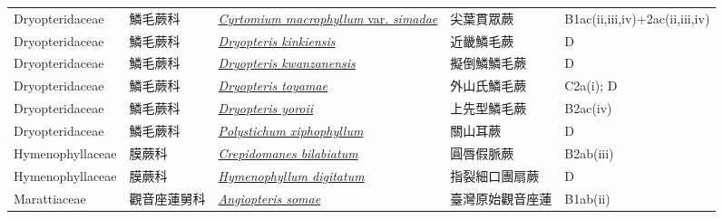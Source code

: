 {\begin{longtable}{p{2.5cm}p{2.5cm}p{4.5cm}p{2.5cm}p{3cm}}
    Dryopteridaceae & 鱗毛蕨科 & \href{http://www.theplantlist.org/tpl1.1/search?q=Cyrtomium+macrophyllum+var.+simadae}{\textit{Cyrtomium macrophyllum} var. \textit{simadae} } & 尖葉貫眾蕨 & B1ac(ii,iii,iv)+2ac(ii,iii,iv) \index{Cyrtomium@\textit{Cyrtomium}!macrophyllum@\textit{macrophyllum}!var. simadae@var. \textit{simadae}}  \index{尖葉貫眾蕨} \\
    Dryopteridaceae & 鱗毛蕨科 & \href{http://www.theplantlist.org/tpl1.1/search?q=Dryopteris+kinkiensis}{\textit{Dryopteris kinkiensis} } & 近畿鱗毛蕨 & D \index{Dryopteris@\textit{Dryopteris}!kinkiensis@\textit{kinkiensis}}  \index{近畿鱗毛蕨} \\
    Dryopteridaceae & 鱗毛蕨科 & \href{http://www.theplantlist.org/tpl1.1/search?q=Dryopteris+kwanzanensis}{\textit{Dryopteris kwanzanensis} } & 擬倒鱗鱗毛蕨 & D \index{Dryopteris@\textit{Dryopteris}!kwanzanensis@\textit{kwanzanensis}}  \index{擬倒鱗鱗毛蕨} \\
    Dryopteridaceae & 鱗毛蕨科 & \href{http://www.theplantlist.org/tpl1.1/search?q=Dryopteris+toyamae}{\textit{Dryopteris toyamae} } & 外山氏鱗毛蕨 & C2a(i); D \index{Dryopteris@\textit{Dryopteris}!toyamae@\textit{toyamae}}  \index{外山氏鱗毛蕨} \\
    Dryopteridaceae & 鱗毛蕨科 & \href{http://www.theplantlist.org/tpl1.1/search?q=Dryopteris+yoroii}{\textit{Dryopteris yoroii} } & 上先型鱗毛蕨 & B2ac(iv) \index{Dryopteris@\textit{Dryopteris}!yoroii@\textit{yoroii}}  \index{上先型鱗毛蕨} \\
    Dryopteridaceae & 鱗毛蕨科 & \href{http://www.theplantlist.org/tpl1.1/search?q=Polystichum+xiphophyllum}{\textit{Polystichum xiphophyllum} } & 關山耳蕨 & D \index{Polystichum@\textit{Polystichum}!xiphophyllum@\textit{xiphophyllum}}  \index{關山耳蕨} \\
    Hymenophyllaceae & 膜蕨科 & \href{http://www.theplantlist.org/tpl1.1/search?q=Crepidomanes+bilabiatum}{\textit{Crepidomanes bilabiatum} } & 圓唇假脈蕨 & B2ab(iii) \index{Crepidomanes@\textit{Crepidomanes}!bilabiatum@\textit{bilabiatum}}  \index{圓唇假脈蕨} \\
    Hymenophyllaceae & 膜蕨科 & \href{http://www.theplantlist.org/tpl1.1/search?q=Hymenophyllum+digitatum}{\textit{Hymenophyllum digitatum} } & 指裂細口團扇蕨 & D \index{Hymenophyllum@\textit{Hymenophyllum}!digitatum@\textit{digitatum}}  \index{指裂細口團扇蕨} \\
    Marattiaceae & 觀音座蓮舅科 & \href{http://www.theplantlist.org/tpl1.1/search?q=Angiopteris+somae}{\textit{Angiopteris somae} } & 臺灣原始觀音座蓮 & B1ab(ii) \index{Angiopteris@\textit{Angiopteris}!somae@\textit{somae}}  \index{臺灣原始觀音座蓮} \\

\end{longtable}}
